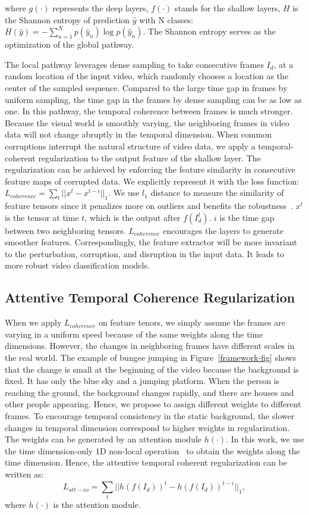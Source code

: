 \documentclass{article} %
\begin{document}
where $g(\cdot)$ represents the deep layers, $f(\cdot)$ stands for the shallow layers, $H$ is the Shannon entropy of prediction $\hat{y}$ with N classes: $H(\hat{y})=-\sum^{N}_{n=1} p(\hat{y}_{n})\log p(\hat{y}_{n})$.
The Shannon entropy serves as the optimization of the global pathway.

The local pathway leverages dense sampling to take consecutive frames $I_{d}$, at a random location of the input video, which randomly chooses a location as the center of the sampled sequence. 
Compared to the large time gap in frames by uniform sampling, the time gap in the frames by dense sampling can be as low as one. 
In this pathway, the temporal coherence between frames is much stronger. 
Because the visual world is smoothly varying, the neighboring frames in video data will not change abruptly in the temporal dimension. 
When common corruptions interrupt the natural structure of video data, we apply a temporal-coherent regularization to the output feature of the shallow layer. The regularization can be achieved by enforcing the feature similarity in consecutive feature maps of corrupted data. We explicitly represent it with the loss function: $L_{coherence} = \sum_{t} || x^{t}-x^{t-i}||_{1}$. We use $l_{1}$ distance to measure the similarity of feature tensors since it penalizes more on outliers and benefits the robustness~\citep{alizadeh2020gradient,bektacs2010comparison}. $x^{t}$ is the tensor at time $t$, which is the output after $f(I^{t}_{d})$. $i$ is the time gap between two neighboring tensors. 
$L_{coherence}$ encourages the layers to generate smoother features. Correspondingly, the feature extractor will be more invariant to the perturbation, corruption, and disruption in the input data. It leads to more robust video classification models.

\subsection{Attentive Temporal Coherence Regularization}
When we apply $L_{coherence}$ on feature tenors, we simply assume the frames are varying in a uniform speed because of the same weights along the time dimensions. 
However, the changes in neighboring frames have different scales in the real world. The example of bungee jumping in Figure~\ref{framework-fig} shows that the change is small at the beginning of the video because the background is fixed. 
It has only the blue sky and a jumping platform. 
When the person is reaching the ground, the background changes rapidly, and there are houses and other people appearing. 
Hence, we propose to assign different weights to different frames.
To encourage temporal consistency in the static background, the slower changes in temporal dimension correspond to higher weights in regularization. 
The weights can be generated by an attention module $h(\cdot)$. 
In this work, we use the time dimension-only 1D non-local operation~\citep{wang2018non} to obtain the weights along the time dimension.
Hence, the attentive temporal coherent regularization can be written as:
\begin{equation}
    L_{att-co} = \sum_{t}||h(f(I_{d}))^{t}-h(f(I_{d}))^{t-i}||_{1},
\end{equation}
where $h(\cdot)$ is the attention module.
\end{document}

